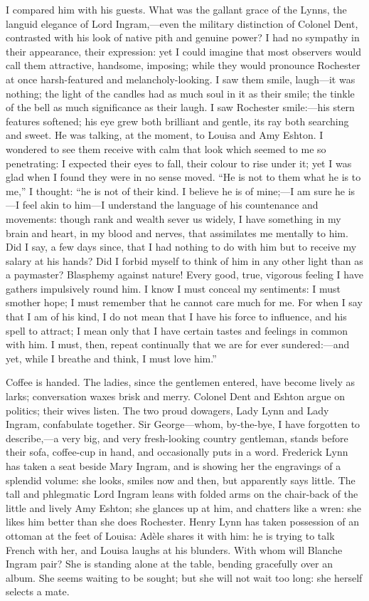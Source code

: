 I compared him with his guests. What was the gallant grace of the
Lynns, the languid elegance of Lord Ingram,---even the military
distinction of Colonel Dent, contrasted with his look of native pith and
genuine power? I had no sympathy in their appearance, their expression:
yet I could imagine that most observers would call them attractive,
handsome, imposing; while they would pronounce \Mr{} Rochester at once
harsh-featured and melancholy-looking. I saw them smile, laugh---it was
nothing; the light of the candles had as much soul in it as their smile;
the tinkle of the bell as much significance as their laugh. I saw \Mr{}
Rochester smile:---his stern features softened; his eye grew both
brilliant and gentle, its ray both searching and sweet. He was talking,
at the moment, to Louisa and Amy Eshton. I wondered to see them receive
with calm that look which seemed to me so penetrating: I expected their
eyes to fall, their colour to rise under it; yet I was glad when I found
they were in no sense moved. \enquote{He is not to them what he is to
	me,} I thought: \enquote{he is not of their kind. I believe he is of
	mine;---I am sure he is---I feel akin to him---I understand the language
	of his countenance and movements: though rank and wealth sever us
	widely, I have something in my brain and heart, in my blood and nerves,
	that assimilates me mentally to him. Did I say, a few days since, that
	I had nothing to do with him but to receive my salary at his hands? Did
	I forbid myself to think of him in any other light than as a paymaster?
	Blasphemy against nature! Every good, true, vigorous feeling I have
	gathers impulsively round him. I know I must conceal my sentiments: I
	must smother hope; I must remember that he cannot care much for me. For
	when I say that I am of his kind, I do not mean that I have his force to
	influence, and his spell to attract; I mean only that I have certain
	tastes and feelings in common with him. I must, then, repeat
	continually that we are for ever sundered:---and yet, while I breathe
	and think, I must love him.}

Coffee is handed. The ladies, since the gentlemen entered, have become
lively as larks; conversation waxes brisk and merry. Colonel Dent and
\Mr{} Eshton argue on politics; their wives listen. The two proud
dowagers, Lady Lynn and Lady Ingram, confabulate together. Sir
George---whom, by-the-bye, I have forgotten to describe,---a very big,
and very fresh-looking country gentleman, stands before their sofa,
coffee-cup in hand, and occasionally puts in a word. \Mr{} Frederick Lynn
has taken a seat beside Mary Ingram, and is showing her the engravings
of a splendid volume: she looks, smiles now and then, but apparently
says little. The tall and phlegmatic Lord Ingram leans with folded arms
on the chair-back of the little and lively Amy Eshton; she glances up at
him, and chatters like a wren: she likes him better than she does \Mr{}
Rochester. Henry Lynn has taken possession of an ottoman at the feet of
Louisa: Adèle shares it with him: he is trying to talk French with her,
and Louisa laughs at his blunders. With whom will Blanche Ingram pair?
She is standing alone at the table, bending gracefully over an album.
She seems waiting to be sought; but she will not wait too long: she
herself selects a mate.

